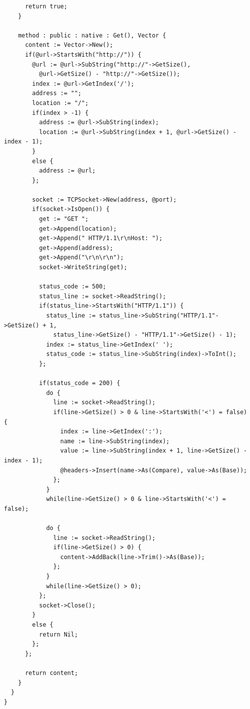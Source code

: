 \documentclass[12pt]{article}
\begin{document}
\begin{verbatim}
      return true;
    }
    
    method : public : native : Get(), Vector {
      content := Vector->New();
      if(@url->StartsWith("http://")) {
        @url := @url->SubString("http://"->GetSize(), 
          @url->GetSize() - "http://"->GetSize());
        index := @url->GetIndex('/');
        address := "";
        location := "/";
        if(index > -1) {
          address := @url->SubString(index);
          location := @url->SubString(index + 1, @url->GetSize() - index - 1);
        }
        else {
          address := @url;
        };
        
        socket := TCPSocket->New(address, @port);
        if(socket->IsOpen()) {
          get := "GET ";
          get->Append(location);
          get->Append(" HTTP/1.1\r\nHost: ");
          get->Append(address);
          get->Append("\r\n\r\n");
          socket->WriteString(get);
  
          status_code := 500;
          status_line := socket->ReadString();
          if(status_line->StartsWith("HTTP/1.1")) {
            status_line := status_line->SubString("HTTP/1.1"->GetSize() + 1, 
              status_line->GetSize() - "HTTP/1.1"->GetSize() - 1);
            index := status_line->GetIndex(' ');
            status_code := status_line->SubString(index)->ToInt();
          };
          
          if(status_code = 200) {
            do {
              line := socket->ReadString();
              if(line->GetSize() > 0 & line->StartsWith('<') = false) {
                index := line->GetIndex(':');
                name := line->SubString(index);
                value := line->SubString(index + 1, line->GetSize() - index - 1);      
                @headers->Insert(name->As(Compare), value->As(Base));
              };
            }
            while(line->GetSize() > 0 & line->StartsWith('<') = false);
            
            do {
              line := socket->ReadString();
              if(line->GetSize() > 0) {
                content->AddBack(line->Trim()->As(Base));  
              };
            }
            while(line->GetSize() > 0);
          };
          socket->Close();
        }
        else {
          return Nil;
        };
      };  
      
      return content;
    }
  }
}
\end{verbatim}

\newpage
\end{document}

